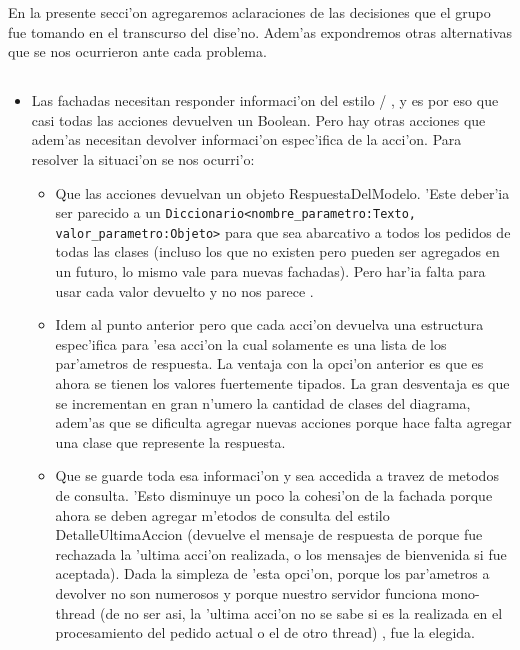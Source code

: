 En la presente secci'on agregaremos aclaraciones de las decisiones que el grupo fue tomando en el transcurso del dise'no. Adem'as expondremos otras alternativas que se nos ocurrieron ante cada problema. 

\subsection{}


\begin{itemize}
\item Las fachadas necesitan responder informaci'on del estilo  / , y es por eso que casi todas las acciones devuelven un Boolean. Pero hay otras acciones que adem'as necesitan devolver informaci'on espec'ifica de la acci'on. Para resolver la situaci'on se nos ocurri'o:
	\begin{itemize}
	\item Que las acciones devuelvan un objeto RespuestaDelModelo. 'Este deber'ia ser parecido a un \verb|Diccionario<nombre_parametro:Texto, valor_parametro:Objeto>| para que sea abarcativo a todos los pedidos de todas las clases (incluso los que no existen pero pueden ser agregados en un futuro, lo mismo vale para nuevas fachadas). Pero har'ia falta  para usar cada valor devuelto y no nos parece .
	\item Idem al punto anterior pero que cada acci'on devuelva una estructura espec'ifica para 'esa acci'on la cual solamente es una lista de los par'ametros de respuesta. La ventaja con la opci'on anterior es que es ahora se tienen los valores fuertemente tipados. La gran desventaja es que se incrementan en gran n'umero la cantidad de clases del diagrama, adem'as que se dificulta agregar nuevas acciones porque hace falta agregar una clase que represente la respuesta.
	\item Que se guarde toda esa informaci'on y sea accedida a travez de metodos de consulta. 'Esto disminuye un poco la cohesi'on de la fachada porque ahora se deben agregar m'etodos de consulta del estilo DetalleUltimaAccion (devuelve el mensaje de respuesta de porque fue rechazada la 'ultima acci'on realizada, o los mensajes de bienvenida si fue aceptada). Dada la simpleza de 'esta opci'on, porque los par'ametros a devolver no son numerosos y porque nuestro servidor funciona mono-thread (de no ser asi, la 'ultima acci'on no se sabe si es la realizada en el procesamiento del pedido actual o el de otro thread) , fue la elegida.
	\end{itemize}


\end{itemize}
